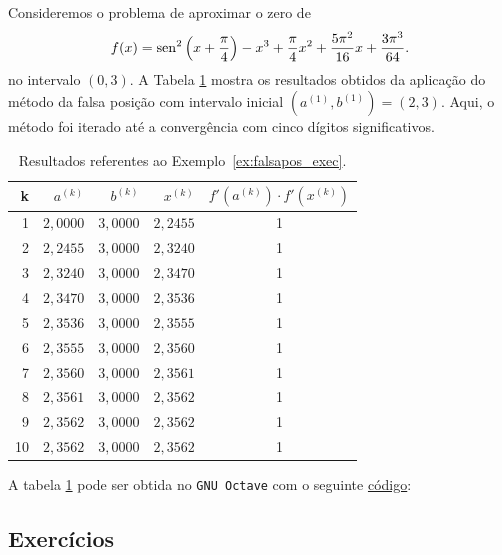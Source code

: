 \begin{ex}\label{ex:falsapos_exec}
  Consideremos o problema de aproximar o zero de
\begin{equation}
  f(x) = \operatorname{sen}^2\left(x+\frac{\pi}{4}\right) - x^3 + \frac{\pi}{4}x^2 + \frac{5\pi^2}{16}x + \frac{3\pi^3}{64}.
\end{equation}
no intervalo $(0, 3)$. A Tabela \ref{tab:falsapos_exec} mostra os resultados obtidos da aplicação do método da falsa posição com intervalo inicial $(a^{(1)}, b^{(1)}) = (2, 3)$. Aqui, o método foi iterado até a convergência com cinco dígitos significativos.

\begin{table}[h!]
  \centering
  \caption{Resultados referentes ao Exemplo~\ref{ex:falsapos_exec}.}
  \begin{tabular}{r|rr|r|c}
    k & $a^{(k)}$ & $b^{(k)}$ & $x^{(k)}$ & $f'(a^{(k)})\cdot f'(x^{(k)})$\\\hline
    1 & $2,0000$ & $3,0000$ & $2,2455$ & 1 \\
    2 & $2,2455$ & $3,0000$ & $2,3240$ &  1 \\
    3 & $2,3240$ & $3,0000$ & $2,3470$ & 1 \\
    4 & $2,3470$ & $3,0000$ & $2,3536$ & 1 \\
    5 & $2,3536$ & $3,0000$ & $2,3555$ & 1 \\
    6 & $2,3555$ & $3,0000$ & $2,3560$ & 1 \\
    7 & $2,3560$ & $3,0000$ & $2,3561$ &  1 \\
    8 & $2,3561$ & $3,0000$ & $2,3562$ & 1 \\
    9 & $2,3562$ & $3,0000$ & $2,3562$ & 1 \\
    10 & $2,3562$ & $3,0000$ & $2,3562$ & 1 \\\hline
  \end{tabular}
  \label{tab:falsapos_exec}
\end{table}

\ifisoctave
A tabela \ref{tab:falsapos_exec} pode ser obtida no \verb+GNU Octave+ com o seguinte \href{https://github.com/phkonzen/notas/blob/master/src/MatematicaNumerica/cap_eq1d/dados/ex_falsapos_exec/ex_falsapos_exec.m}{código}:

\fi
\end{ex}

\subsection*{Exercícios}

